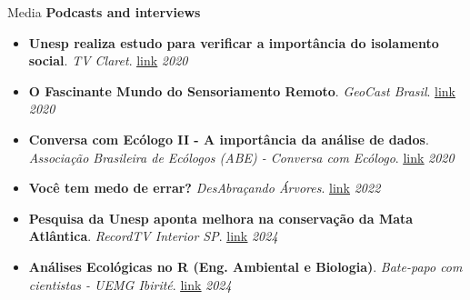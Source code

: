 \documentclass{resume}
\begin{document}
\begin{rSection}{Media}
\textbf{Podcasts and interviews}
\begin{itemize} 
\item \textbf{Unesp realiza estudo para verificar a importância do isolamento social}. \textit{TV Claret}. \href{https://youtu.be/RP6rUQpberE}{\underline{link}} \hfill{\em 2020}
\item \textbf{O Fascinante Mundo do Sensoriamento Remoto}. \textit{GeoCast Brasil}. \href{https://open.spotify.com/episode/0Kn5k9039vM8bZgb4YdlJJ?si=S5hfhNc6S6GfDFaJSsaQDA}{\underline{link}} \hfill{\em 2020}
\item \textbf{Conversa com Ecólogo II - A importância da análise de dados}. \textit{Associação Brasileira de Ecólogos (ABE) - Conversa com Ecólogo}. \href{https://www.instagram.com/p/CFQVjMtH6qk/}{\underline{link}} \hfill{\em 2020}
\item \textbf{Você tem medo de errar?} \textit{DesAbraçando Árvores}. \href{https://www.desabrace.com.br/092-voce-tem-medo-de-errar/}{\underline{link}} \hfill{\em 2022} 
\item \textbf{Pesquisa da Unesp aponta melhora na conservação da Mata Atlântica}. \textit{RecordTV Interior SP}. \href{https://recordtv.r7.com/recordtv-interior-sp/sp-record/pesquisa-da-unesp-aponta-melhora-na-conservacao-da-mata-atlantica-27032024?utm_source=link_direto&utm_medium=share-bar&utm_campaign=r7-topo}{\underline{link}} \hfill{\em 2024}
\item \textbf{Análises Ecológicas no R (Eng. Ambiental e Biologia)}. \textit{Bate-papo com cientistas - UEMG Ibirité}. \href{https://open.spotify.com/episode/4LiZ1WDiwKngynSlnXsrZI?si=fNc4zFZxQNC2Bp1RQqNgqw&nd=1&dlsi=497a0d5ac54b4257}{\underline{link}} \hfill{\em 2024}
\end{itemize} 
\end{rSection}

\end{document}
